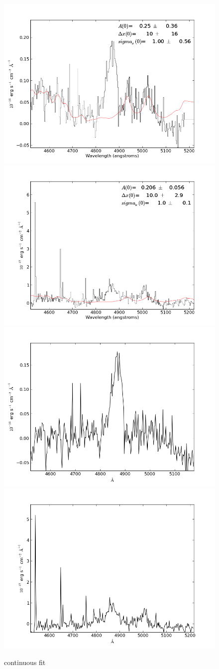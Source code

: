 \documentclass[usenatbib]{mn2e}
\begin{document}
\newpage


\begin{figure}
\begin{center}
\includegraphics[width=0.46\linewidth,angle=0]{fe_fit_Hbeta_6.png}
\vspace{5mm}
\includegraphics[width=0.49\linewidth,angle=0]{fe_fit_Hbeta_7.png}\\
\includegraphics[width=0.46\linewidth,angle=0]{fe_fit_Hbeta_res_6.png}
\hspace{5mm}
\includegraphics[width=0.49\linewidth,angle=0]{fe_fit_Hbeta_res_7.png}\\
\end{center} 
\caption{continuous fit \label{fig:landscape}}   
\end{figure}
\end{document}
